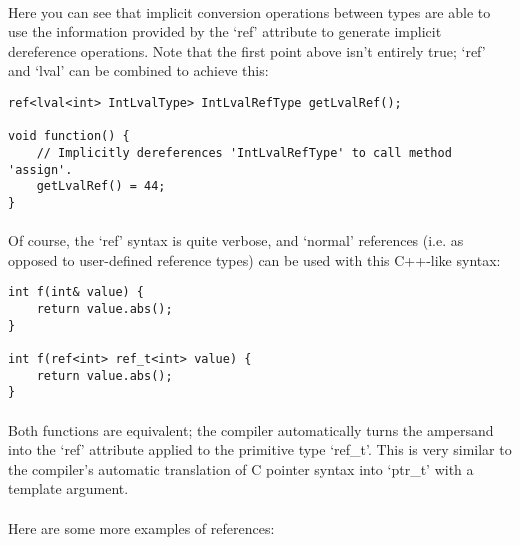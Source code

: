 \documentclass[12pt,twoside,notitlepage]{report}
\begin{document}
\paragraph{}
Here you can see that implicit conversion operations between types are able to use the information provided by the `ref' attribute to generate implicit dereference operations. Note that the first point above isn't entirely true; `ref' and `lval' can be combined to achieve this:

\begin{lstlisting}
ref<lval<int> IntLvalType> IntLvalRefType getLvalRef();

void function() {
	// Implicitly dereferences 'IntLvalRefType' to call method 'assign'.
	getLvalRef() = 44;
}
\end{lstlisting}

\paragraph{}
Of course, the `ref' syntax is quite verbose, and `normal' references (i.e. as opposed to user-defined reference types) can be used with this C++-like syntax:

\begin{lstlisting}
int f(int& value) {
	return value.abs();
}

int f(ref<int> ref_t<int> value) {
	return value.abs();
}
\end{lstlisting}

\paragraph{}
Both functions are equivalent; the compiler automatically turns the ampersand into the `ref' attribute applied to the primitive type `ref\_t'. This is very similar to the compiler's automatic translation of C pointer syntax into `ptr\_t' with a template argument.

\paragraph{}
Here are some more examples of references:
\end{document}
